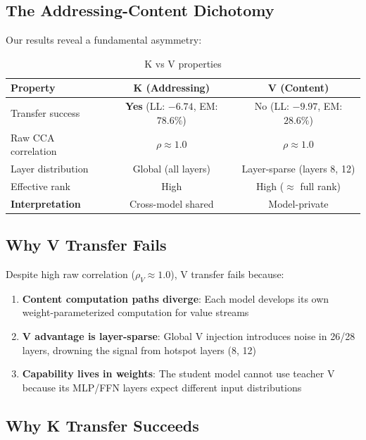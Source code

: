\documentclass[11pt]{article}
\begin{document}
\subsection{The Addressing-Content Dichotomy}

Our results reveal a fundamental asymmetry:

\begin{table}[h]
\centering
\caption{K vs V properties}
\begin{tabular}{lcc}
\toprule
Property & K (Addressing) & V (Content) \\
\midrule
Transfer success & \textbf{Yes} (LL: $-6.74$, EM: $78.6\%$) & No (LL: $-9.97$, EM: $28.6\%$) \\
Raw CCA correlation & $\rho \approx 1.0$ & $\rho \approx 1.0$ \\
Layer distribution & Global (all layers) & Layer-sparse (layers 8, 12) \\
Effective rank & High & High ($\approx$ full rank) \\
\midrule
\textbf{Interpretation} & Cross-model shared & Model-private \\
\bottomrule
\end{tabular}
\end{table}

\subsection{Why V Transfer Fails}

Despite high raw correlation ($\rho_V \approx 1.0$), V transfer fails because:

\begin{enumerate}
    \item \textbf{Content computation paths diverge}: Each model develops its own weight-parameterized computation for value streams
    \item \textbf{V advantage is layer-sparse}: Global V injection introduces noise in 26/28 layers, drowning the signal from hotspot layers (8, 12)
    \item \textbf{Capability lives in weights}: The student model cannot use teacher V because its MLP/FFN layers expect different input distributions
\end{enumerate}

\subsection{Why K Transfer Succeeds}
\end{document}
